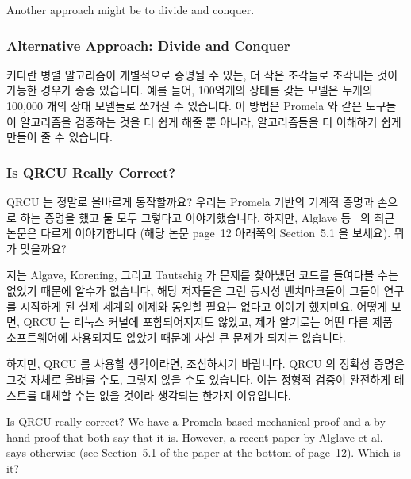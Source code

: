 Another approach might be to divide and conquer.
\fi

\subsubsection{Alternative Approach: Divide and Conquer}
\label{sec:formal:Alternative Approach: Divide and Conquer}

커다란 병렬 알고리즘이 개별적으로 증명될 수 있는, 더 작은 조각들로 조각내는
것이 가능한 경우가 종종 있습니다.
예를 들어, 100억개의 상태를 갖는 모델은 두개의 100,000 개의 상태 모델들로
쪼개질 수 있습니다.
이 방법은 Promela 와 같은 도구들이 알고리즘을 검증하는 것을 더 쉽게 해줄 뿐
아니라, 알고리즘들을 더 이해하기 쉽게 만들어 줄 수 있습니다.
\iffalse

It is often possible to break down a larger parallel algorithm into
smaller pieces, which can then be proven separately.
For example, a 10-billion-state model might be broken into a pair
of 100,000-state models.
Taking this approach not only makes it easier for tools such as
Promela to verify your algorithms, it can also make your algorithms
easier to understand.
\fi

\subsubsection{Is QRCU Really Correct?}
\label{sec:formal:Is QRCU Really Correct?}

QRCU 는 정말로 올바르게 동작할까요?
우리는 Promela 기반의 기계적 증명과 손으로 하는 증명을 했고 둘 모두 그렇다고
이야기했습니다.
하지만, Alglave 등~\cite{JadeAlglave2013-cav} 의 최근 논문은 다르게
이야기합니다 (해당 논문 page~12  아래쪽의 Section~5.1 을 보세요).
뭐가 맞을까요?

저는 Algave, Korening, 그리고 Tautschig 가 문제를 찾아냈던 코드를 들여다볼 수는
없었기 때문에 알수가 없습니다, 해당 저자들은 그런 동시성 벤치마크들이 그들이
연구를 시작하게 된 실제 세계의 예제와 동일할 필요는 없다고 이야기 했지만요.
어떻게 보면, QRCU 는 리눅스 커널에 포함되어지지도 않았고, 제가 알기로는 어떤
다른 제품 소프트웨어에 사용되지도 않았기 때문에 사실 큰 문제가 되지는 않습니다.

하지만, QRCU 를 사용할 생각이라면, 조심하시기 바랍니다.
QRCU 의 정확성 증명은 그것 자체로 올바를 수도, 그렇지 않을 수도 있습니다.
이는 정형적 검증이 완전하게 테스트를 대체할 수는 없을 것이라 생각되는 한가지
이유입니다.
\iffalse

Is QRCU really correct?
We have a Promela-based mechanical proof and a by-hand proof that both
say that it is.
However, a recent paper by Alglave et al.~\cite{JadeAlglave2013-cav}
says otherwise (see Section~5.1 of the paper at the bottom of page~12).
Which is it?


